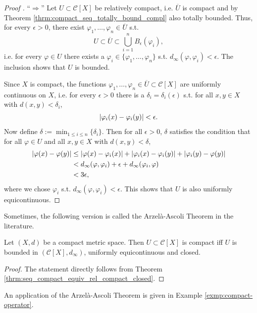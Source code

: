 \begin{proof}[Proof \cite{src:arzela_ascoli_theorem}]
	\enquote{$\Longrightarrow$} Let $U\subset \mathcal C[X]$ be relatively compact, i.e. $\overline{U}$ is compact and by Theorem \ref{thrm:compact_seq_totally_bound_compl} also totally bounded. Thus, for every $\epsilon > 0$, there exist $\varphi_1, \dots, \varphi_n\in\overline{U}$ s.t. 
	\[
		U \subset \overline{U} \subset \bigcup_{i=1}^{n}B_{\epsilon}(\varphi_i),
	\]
	i.e. for every $\varphi\in U$ there exists a $\varphi_i\in \{\varphi_1, \dots, \varphi_n\}$ s.t. $d_{\infty}(\varphi, \varphi_i) < \epsilon$. The inclusion shows that $U$ is bounded. 
	
	Since $X$ is compact, the functions $\varphi_1, \dots, \varphi_n\in\overline{U}\subset \mathcal C[X]$ are uniformly continuous on $X$, i.e. for every $\epsilon > 0$ there is a $\delta_i= \delta_i(\epsilon)$ s.t. for all $x, y\in X$ with $d(x, y) < \delta_i$, 
	\[
		\left\vert \varphi_i(x) - \varphi_i(y) \right\vert < \epsilon.
	\]
	Now define $\delta := \min_{1\leq i\leq n}\{\delta_i\}$. Then for all $\epsilon > 0$, $\delta$ satisfies the condition that for all $\varphi\in U$ and all $x, y\in X$ with $d(x, y) < \delta$, 
	\begin{align*}
		\left\vert \varphi(x) - \varphi(y) \right\vert &\leq \left\vert \varphi(x) - \varphi_i(x) \right\vert + \left\vert \varphi_i(x) - \varphi_i(y) \right\vert + \left\vert \varphi_i(y) - \varphi(y) \right\vert 
		\\ &< d_{\infty}(\varphi, \varphi_i) + \epsilon + d_{\infty}(\varphi_i, \varphi)
		\\ &< 3\epsilon,
	\end{align*}
	where we chose $\varphi_i$ s.t. $d_{\infty}(\varphi, \varphi_i) < \epsilon$. This shows that $U$ is also uniformly equicontinuous.
\end{proof}

Sometimes, the following version is called the Arzel\`a-Ascoli Theorem in the literature.

\begin{corollary}
	Let $(X, d)$ be a compact metric space. Then $U\subset \mathcal C[X]$ is compact iff $U$ is bounded in $(\mathcal C[X], d_{\infty})$, uniformly equicontinuous and closed.
\end{corollary}

\begin{proof}
	The statement directly follows from Theorem \ref{thrm:seq_compact_equiv_rel_compact_closed}.
\end{proof}

An application of the Arzel\`a-Ascoli Theorem is given in Example \ref{exmp:compact-operator}.

